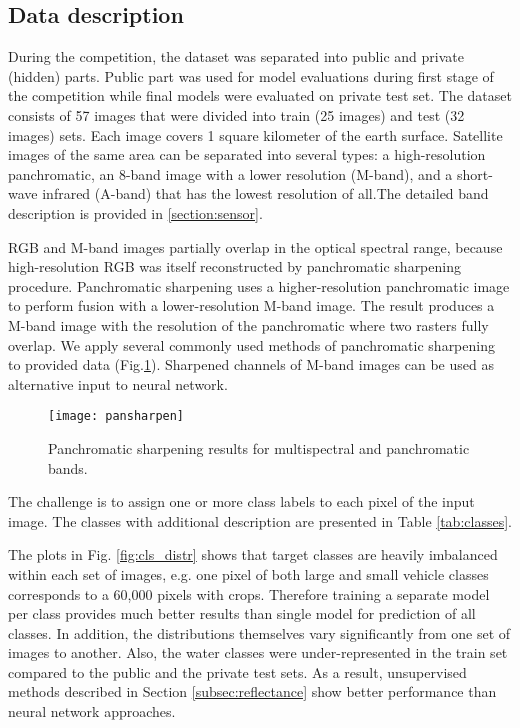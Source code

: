 \documentclass[10pt,twocolumn,letterpaper]{article}
\begin{document}
\subsection{Data description}

During the competition, the dataset was separated into public and private (hidden) parts. Public part was used for model evaluations during first stage of the competition while final models were evaluated on private test set.
The dataset consists of 57 images that were divided into train (25 images) and test (32 images) sets. Each image covers 1 square kilometer of the earth surface. Satellite images of the same area can be separated into several types: a high-resolution panchromatic, an 8-band image with a lower resolution (M-band), and a short-wave infrared (A-band) that has the lowest resolution of all.The detailed band description is provided in \ref{section:sensor}.

RGB and M-band images partially overlap in the optical spectral range, because high-resolution RGB was itself reconstructed by panchromatic sharpening procedure. Panchromatic sharpening uses a higher-resolution panchromatic image to perform  fusion with a lower-resolution M-band image. The result produces a M-band image with the resolution of the panchromatic  where two rasters fully overlap. We apply several commonly used methods of panchromatic sharpening \cite{pansharp} to provided data (Fig.\ref{fig:pan}). Sharpened channels of M-band images can be used as alternative input to neural network.

\begin{figure}[!h]
	\captionsetup{justification=centering}
	\centering
	\texttt{[image: pansharpen]}
	\caption{Panchromatic sharpening results for multispectral and panchromatic bands.}
	\label{fig:pan}
\end{figure}

The challenge is to assign one or more class labels to each pixel of the input image. The classes with additional description are presented in Table \ref{tab:classes}.

The plots in Fig. \ref{fig:cls_distr} shows that target classes are heavily imbalanced within each set of images, e.g. one pixel of both large and small vehicle classes corresponds to a 60,000 pixels with crops. Therefore training a separate model per class provides much better results than single model for prediction of all classes. In addition, the distributions themselves vary significantly from one set of images to another. Also, the water classes were under-represented in the train set compared to the public and the private test sets. As a result, unsupervised methods described in Section \ref{subsec:reflectance} show better performance than neural network approaches.
\end{document}
